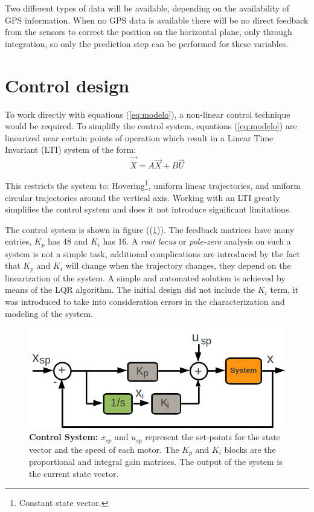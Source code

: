 \documentclass[conference]{IEEEtran}
\newcommand{\refp}[1]{(\ref{#1})}
\begin{document}
Two different types of data will be available, depending on the availability of GPS information. When no GPS data is available there will be no direct feedback from the sensors to correct the position on the horizontal plane, only through integration, so only the prediction step can be performed for these variables.


\section{Control design}
\label{sec:control}

To work directly with equations \refp{eq:modelo}, a non-linear control technique would be required. To simplifly the control system, equations \refp{eq:modelo} are linearized near certain points of operation which result in a Linear Time Invariant (LTI) system of the form:
\begin{equation}
  \label{eq:lti}
  \vec{\dot{X}} = A\vec{X} + B\vec{U}
\end{equation}

This restricts the system to: Hovering\footnote{Constant state vector.}, uniform linear trajectories, and uniform circular trajectories around the vertical axis. Working with an LTI greatly simplifies the control system and does it not introduce significant limitations.

The control system is shown in figure (\refp{fig:diagrama_bloques_eng.pdf}). The feedback matrices have many entries, $K_p$ has 48 and $K_i$ has 16. A \textit{root locus} or \textit{pole-zero} analysis on such a system is not a simple task, additional complications are introduced by the fact that $K_p$ and $K_i$ will change when the trajectory changes, they depend on the linearization of the system. A simple and automated solution is achieved by means of the LQR algorithm. The initial design did not include the $K_i$ term, it was introduced to take into consideration errors in the characterization and modeling of the system.

\begin{figure}
	\centering
	\includegraphics[width=1\columnwidth]{./pics_paper/diagrama_bloques_eng.png}
	\caption{\textbf{Control System:} $x_{sp}$ and $u_{sp}$ represent the set-points for the state vector and the speed of each motor. The $K_p$ and $K_i$ blocks are the proportional and integral gain matrices. The output of the system is the current state vector.}
	\label{fig:diagrama_bloques_eng.pdf}
\end{figure}
\end{document}
